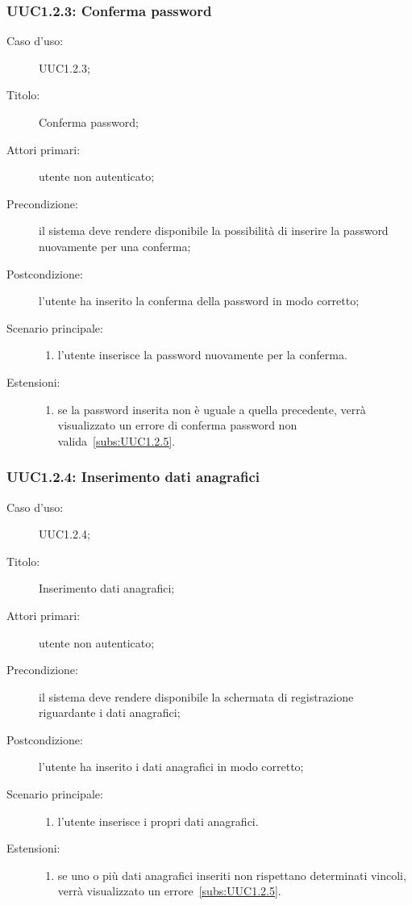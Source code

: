 \documentclass[../../../analisi-dei-requisiti.tex]{subfiles}
\begin{document}
\subsubsection{UUC1.2.3: Conferma password}%
\label{subs:UUC1.2.3}
\begin{description}
  \item[Caso d’uso:] UUC1.2.3;
  \item[Titolo:] Conferma password;
  \item[Attori primari:] utente non autenticato;
  \item[Precondizione:] il sistema deve rendere disponibile la possibilità di inserire la password nuovamente per una conferma;
  \item[Postcondizione:] l'utente ha inserito la conferma della password in modo corretto;
  \item[Scenario principale:]
        \begin{enumerate}
          \item l'utente inserisce la password nuovamente per la conferma.
        \end{enumerate}
  \item[Estensioni:]
        \begin{enumerate}
          \item se la password inserita non è uguale a quella precedente, verrà visualizzato un errore di conferma password non valida~\ref{subs:UUC1.2.5}.
        \end{enumerate}
\end{description}



\subsubsection{UUC1.2.4: Inserimento dati anagrafici}%
\label{subs:UUC1.2.4}
\begin{description}
  \item[Caso d’uso:] UUC1.2.4;
  \item[Titolo:] Inserimento dati anagrafici;
  \item[Attori primari:] utente non autenticato;
  \item[Precondizione:] il sistema deve rendere disponibile la schermata di registrazione riguardante i dati anagrafici;
  \item[Postcondizione:] l'utente ha inserito i dati anagrafici in modo corretto;
  \item[Scenario principale:]
        \begin{enumerate}
          \item l'utente inserisce i propri dati anagrafici.
        \end{enumerate}
  \item[Estensioni:]
        \begin{enumerate}
          \item se uno o più dati anagrafici inseriti non rispettano determinati vincoli, verrà visualizzato un errore~\ref{subs:UUC1.2.5}.
        \end{enumerate}
\end{description}
\end{document}
